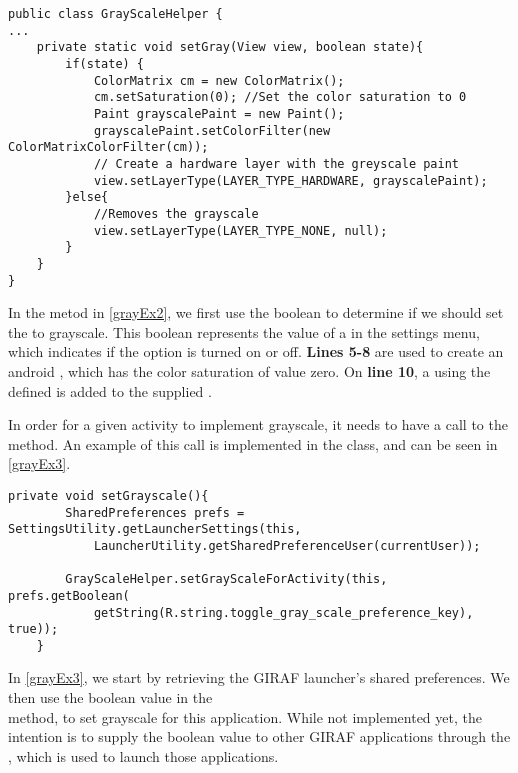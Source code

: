 \begin{minipage}[H]{\linewidth}
\begin{lstlisting}[caption = Method used to change to color saturation of views., label = grayEx2]
public class GrayScaleHelper {
...
    private static void setGray(View view, boolean state){
        if(state) {
            ColorMatrix cm = new ColorMatrix();
            cm.setSaturation(0); //Set the color saturation to 0
            Paint grayscalePaint = new Paint();
            grayscalePaint.setColorFilter(new ColorMatrixColorFilter(cm));
            // Create a hardware layer with the greyscale paint
            view.setLayerType(LAYER_TYPE_HARDWARE, grayscalePaint);
        }else{
            //Removes the grayscale
            view.setLayerType(LAYER_TYPE_NONE, null);
        }
    }
}
\end{lstlisting}
\end{minipage}

In the  metod in \autoref{grayEx2}, we first use the boolean
 to determine if we should set the  to grayscale. This
boolean represents the value of a  in the settings menu,
which indicates if the option is turned on or off. \textbf{Lines 5-8} are used
to create an android , which has the color saturation of value
zero. On \textbf{line 10}, a  using the defined
 is added to the supplied .\nl

In order for a given activity to implement grayscale, it needs to have a call to
the  method. An example of this call is
implemented in the  class, and can be seen in
\autoref{grayEx3}.\nl

\begin{minipage}[H]{\linewidth}
\begin{lstlisting}[caption = Setting grayscale by calling the setGrayScaleForActivity method, label = grayEx3] 
private void setGrayscale(){
        SharedPreferences prefs = SettingsUtility.getLauncherSettings(this,
            LauncherUtility.getSharedPreferenceUser(currentUser));

        GrayScaleHelper.setGrayScaleForActivity(this, prefs.getBoolean(
            getString(R.string.toggle_gray_scale_preference_key), true));
    }
\end{lstlisting}
\end{minipage}

In \autoref{grayEx3}, we start by retrieving the GIRAF launcher's shared
preferences. We then use the boolean
 value in the \\
 method, to set grayscale for this
application. While not implemented yet, the intention is to supply the boolean
value to other GIRAF applications through the , which is
used to launch those applications.\nl

